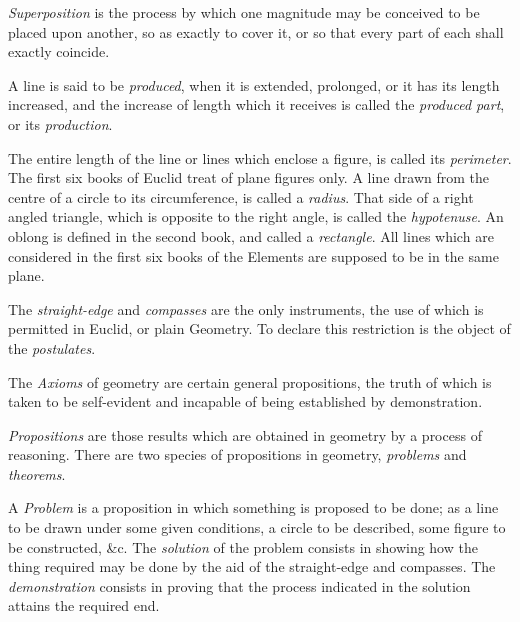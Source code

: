 \documentclass[12pt]{article}
\begin{document}
\vspace{0.4cm}

\noindent
\emph{Superposition} is the process by which one magnitude may be conceived
to be placed upon another, so as exactly to cover it, or so that every part
of each shall exactly coincide.

\vspace{0.4cm}

\noindent
A line is said to be \emph{produced}, when it is extended, prolonged, or it
has its length increased, and the increase of length which it receives is
called the \emph{produced part}, or its \emph{production}.

\vspace{0.4cm}

\noindent
The entire length of the line or lines which enclose a figure, is called its
\emph{perimeter}. The first six books of Euclid treat of plane figures only.
A line drawn from the centre of a circle to its circumference, is called a
\emph{radius}. That side of a right angled triangle, which is opposite to the
right angle, is called the \emph{hypotenuse}. An oblong is defined in the
second book, and called a \emph{rectangle}. All lines which are considered in
the first six books of the Elements are supposed to be in the same plane.

\vspace{0.4cm}

\noindent
The \emph{straight-edge} and \emph{compasses} are the only instruments, the
use of which is permitted in Euclid, or plain Geometry. To declare this
restriction is the object of the \emph{postulates}.

\vspace{0.4cm}

\noindent
The \emph{Axioms} of geometry are certain general propositions, the truth of
which is taken to be self-evident and incapable of being established by
demonstration.

\vspace{0.4cm}

\noindent
\emph{Propositions} are those results which are obtained in geometry by a
process of reasoning. There are two species of propositions in geometry,
\emph{problems} and \emph{theorems}.

\vspace{0.4cm}

\noindent
A \emph{Problem} is a proposition in which something is proposed to be done;
as a line to be drawn under some given conditions, a circle to be described,
some figure to be constructed, \&c. The \emph{solution} of the problem
consists in showing how the thing required may be done by the aid of the
straight-edge and compasses. The \emph{demonstration} consists in proving
that the process indicated in the solution attains the required end.
\end{document}
